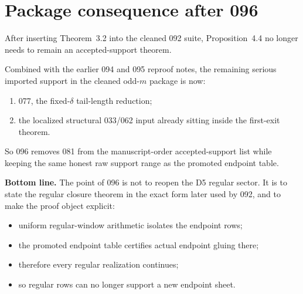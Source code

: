 \documentclass[11pt]{article}
\begin{document}
\section{Package consequence after 096}

After inserting Theorem~3.2 into the cleaned 092 suite, Proposition~4.4 no
longer needs to remain an accepted-support theorem.

Combined with the earlier 094 and 095 reproof notes, the remaining serious
imported support in the cleaned odd-$m$ package is now:
\begin{enumerate}[label=\textup{(\arabic*)},leftmargin=2.5em]
\item 077, the fixed-$\delta$ tail-length reduction;
\item the localized structural 033/062 input already sitting inside the
      first-exit theorem.
\end{enumerate}

So 096 removes 081 from the manuscript-order accepted-support list while
keeping the same honest raw support range as the promoted endpoint table.

\bigskip
\noindent
\textbf{Bottom line.}
The point of 096 is not to reopen the D5 regular sector. It is to state the
regular closure theorem in the exact form later used by 092, and to make the
proof object explicit:
\begin{itemize}[leftmargin=2em]
\item uniform regular-window arithmetic isolates the endpoint rows;
\item the promoted endpoint table certifies actual endpoint gluing there;
\item therefore every regular realization continues;
\item so regular rows can no longer support a new endpoint sheet.
\end{itemize}
\end{document}
